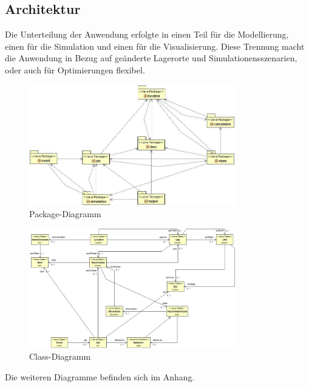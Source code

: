 \subsection{Architektur}
Die Unterteilung der Anwendung erfolgte in einen Teil für die Modellierung, einen für die Simulation und einen für die Visualisierung. Diese Trennung macht die Anwendung in Bezug auf geänderte Lagerorte und Simulationensszenarien, oder auch für Optimierungen flexibel.
%
%
\begin{figure}[H]
  \begin{center}
    \includegraphics[width=0.8\textwidth]{images/package_diagramm.png}
    \caption{Package-Diagramm}
    \label{fig:packages}
  \end{center}
\end{figure}
%
\begin{figure}[H]
  \begin{center}
    \includegraphics[width=0.8\textwidth]{images/class_diagramm.png}
    \caption{Class-Diagramm}
    \label{fig:class}
  \end{center}
\end{figure}
%
Die weiteren Diagramme befinden sich im Anhang.



